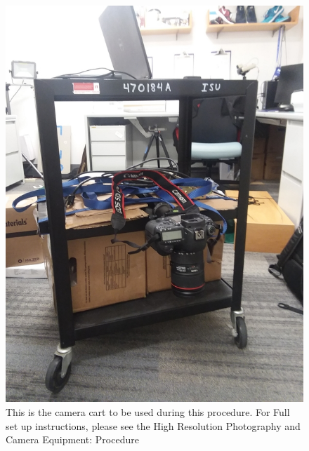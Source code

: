 \begin{figure}[!htp]
\centering
\includegraphics[scale=.2]{Cart1}
\caption{This is the camera cart to be used during this procedure. For Full set up instructions, please see the High Resolution Photography and Camera Equipment: Procedure }
\label{Figure 2}
\end{figure}

